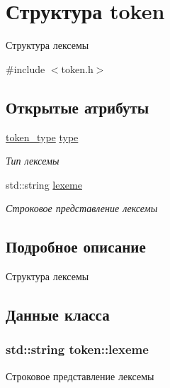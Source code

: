 \hypertarget{structtoken}{}\section{Структура token}
\label{structtoken}


Структура лексемы  




{\ttfamily \#include $<$token.\+h$>$}

\subsection*{Открытые атрибуты}
\begin{DoxyCompactItemize}
\item 
\hyperlink{token_8h_afe5ef662303b6b710ea6ee1a944bad0d}{token\+\_\+type} \hyperlink{structtoken_ae4872e33fcec00c59c994c4c9ee3a1f5}{type}
\begin{DoxyCompactList}\small\item\em Тип лексемы \end{DoxyCompactList}\item 
std\+::string \hyperlink{structtoken_a9924c7bd1281e815967e0610dbaeaff1}{lexeme}
\begin{DoxyCompactList}\small\item\em Строковое представление лексемы \end{DoxyCompactList}\end{DoxyCompactItemize}


\subsection{Подробное описание}
Структура лексемы 

\subsection{Данные класса}
\subsubsection[{\texorpdfstring{lexeme}{lexeme}}]{\setlength{\rightskip}{0pt plus 5cm}std\+::string token\+::lexeme}\hypertarget{structtoken_a9924c7bd1281e815967e0610dbaeaff1}{}\label{structtoken_a9924c7bd1281e815967e0610dbaeaff1}


Строковое представление лексемы 

